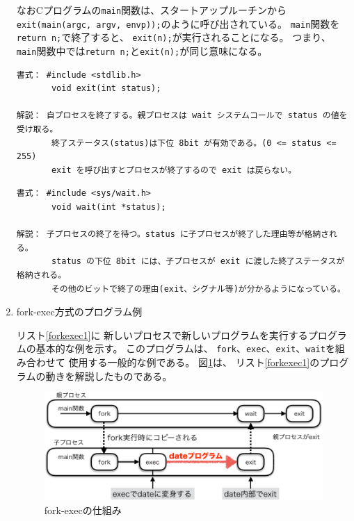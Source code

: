 \documentclass[a4j,dvipdfmx]{jarticle}
\begin{document}
\begin{enumerate}
なおCプログラムの\verb/main/関数は、スタートアップルーチンから
\verb/exit(main(argc, argv, envp));/のように呼び出されている。
\verb/main/関数を\verb/return n;/で終了すると、
\verb/exit(n);/が実行されることになる。
つまり、
\verb/main/関数中では\verb/return n;/と\verb/exit(n);/が同じ意味になる。

\begin{lstlisting}[numbers=none]
書式： #include <stdlib.h>
       void exit(int status);

解説： 自プロセスを終了する。親プロセスは wait システムコールで status の値を受け取る。
       終了ステータス(status)は下位 8bit が有効である。(0 <= status <= 255)
       exit を呼び出すとプロセスが終了するので exit は戻らない。
\end{lstlisting}

\begin{lstlisting}[numbers=none]
書式： #include <sys/wait.h>
       void wait(int *status);

解説： 子プロセスの終了を待つ。status に子プロセスが終了した理由等が格納される。
       status の下位 8bit には、子プロセスが exit に渡した終了ステータスが格納される。
       その他のビットで終了の理由(exit、シグナル等)が分かるようになっている。
\end{lstlisting}

\item fork-exec方式のプログラム例

リスト\ref{forkexec1}に
新しいプロセスで新しいプログラムを実行するプログラムの基本的な例を示す。
このプログラムは、
\verb/fork/、\verb/exec/、\verb/exit/、\verb/wait/を組み合わせて
使用する一般的な例である。
図\ref{fig_forkexec}は、
リスト\ref{forkexec1}のプログラムの動きを解説したものである。

\begin{figure}[hbtp]
\begin{center}
\includegraphics[scale=0.8]{fork-exec-crop.pdf}
\caption{fork-execの仕組み}
\label{fig_forkexec}
\end{center}
\end{figure}


\end{enumerate}
\end{document}
